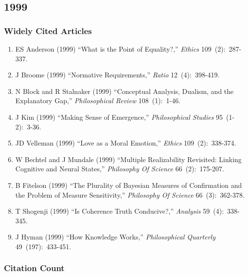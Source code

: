 \documentclass[
  10pt,
  letterpaper,
  DIV=11,
  numbers=noendperiod,
  twoside]{scrartcl}
\providecommand{\tightlist}{%
  \setlength{\itemsep}{0pt}\setlength{\parskip}{0pt}}\usepackage{longtable,booktabs,array}
\begin{document}
\newpage

\subsection{1999}\label{sec-s1999}

\subsubsection*{Widely Cited Articles}\label{widely-cited-articles-43}

\begin{enumerate}
\def\labelenumi{\arabic{enumi}.}
\tightlist
\item
  ES Anderson (1999) ``What is the Point of Equality?,'' \emph{Ethics}
  109~(2):~287-337.
\item
  J Broome (1999) ``Normative Requirements,'' \emph{Ratio}
  12~(4):~398-419.
\item
  N Block and R Stalnaker (1999) ``Conceptual Analysis, Dualism, and the
  Explanatory Gap,'' \emph{Philosophical Review} 108~(1):~1-46.
\item
  J Kim (1999) ``Making Sense of Emergence,'' \emph{Philosophical
  Studies} 95~(1-2):~3-36.
\item
  JD Velleman (1999) ``Love as a Moral Emotion,'' \emph{Ethics}
  109~(2):~338-374.
\item
  W Bechtel and J Mundale (1999) ``Multiple Realizability Revisited:
  Linking Cognitive and Neural States,'' \emph{Philosophy Of Science}
  66~(2):~175-207.
\item
  B Fitelson (1999) ``The Plurality of Bayesian Measures of Confirmation
  and the Problem of Measure Sensitivity,'' \emph{Philosophy Of Science}
  66~(3):~362-378.
\item
  T Shogenji (1999) ``Is Coherence Truth Conducive?,'' \emph{Analysis}
  59~(4):~338-345.
\item
  J Hyman (1999) ``How Knowledge Works,'' \emph{Philosophical Quarterly}
  49~(197):~433-451.
\end{enumerate}

\subsubsection*{Citation Count}\label{sec-count-1999}
\end{document}
